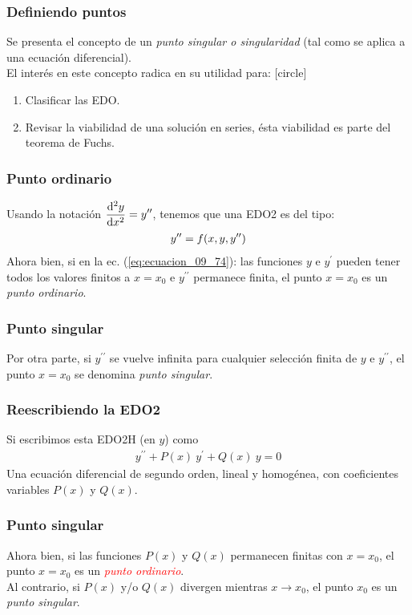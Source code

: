 \documentclass[12pt]{beamer}
\begin{document}
\begin{frame}
\frametitle{Definiendo puntos}
Se presenta el concepto de un \emph{punto singular o singularidad} (tal como se aplica a una ecuación diferencial).
\\
\bigskip
\pause
El interés en este concepto radica en su utilidad para:
[circle]
\begin{enumerate}[<+->]
\item Clasificar las EDO.
\item Revisar la viabilidad de una solución en series, ésta viabilidad es parte del teorema de Fuchs.
\end{enumerate}
\end{frame}
\begin{frame}
\frametitle{Punto ordinario}
Usando la notación $\displaystyle \dv[2]{y}{x} = {y}^{\prime \prime}$, tenemos que una EDO2 es del tipo:
\begin{align}
{y}^{\prime \prime} = f(x, y, {y}^{\prime \prime})
\label{eq:ecuacion_09_74}
\end{align}
\pause
Ahora bien, si en la ec. (\ref{eq:ecuacion_09_74}): las funciones $y$ e $y^{\prime}$ pueden tener todos los valores finitos a $x = x_{0}$ e $y^{\prime \prime}$ permanece finita, el punto $x = x_{0}$ es un \emph{punto ordinario}.
\end{frame}
\begin{frame}
\frametitle{Punto singular}
Por otra parte, si $y^{\prime \prime}$ se vuelve infinita para cualquier selección finita de $y$ e  $y^{\prime \prime}$, el punto $x = x_{0}$ se denomina \emph{punto singular}.
\end{frame}
\begin{frame}
\frametitle{Reescribiendo la EDO2}
Si escribimos esta EDO2H (en $y$) como
\begin{align}
y^{\prime \prime} + P(x) \: y^{\prime} + Q(x) \: y = 0
\label{eq:ecuacion_09_75}
\end{align}
\pause
Una ecuación diferencial de segundo orden, lineal y homogénea, con coeficientes variables $P(x)$ y $Q(x)$.
\end{frame}
\begin{frame}
\frametitle{Punto singular}
Ahora bien, si las funciones $P(x)$ y $Q(x)$ permanecen finitas con $x = x_{0}$, el punto $x = x_{0}$ es un \emph{\textcolor{red}{punto ordinario}}.
\\
\bigskip
\pause
Al contrario, si $P(x)$ y/o $Q(x)$ divergen mientras $x \to x_{0}$, el punto $x_{0}$ es un \emph{\textcolor{green!50!black}{punto singular}}.
\end{frame}
\end{document}

